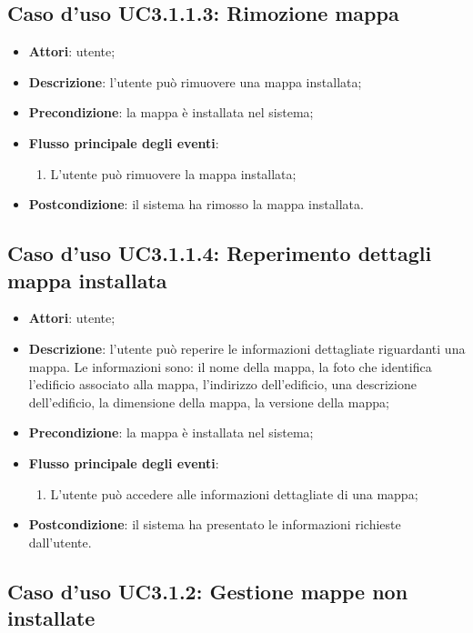 \documentclass[../AnalisiDeiRequisiti.tex]{subfiles}
\begin{document}
\subsection{Caso d'uso UC3.1.1.3: Rimozione mappa}
\begin{itemize}
	\item \textbf{Attori}: utente;
	\item \textbf{Descrizione}: l'utente può rimuovere una mappa installata; 
	\item \textbf{Precondizione}: la mappa è installata nel sistema;
	
	\item \textbf{Flusso principale degli eventi}:
	\begin{enumerate}
		\item L'utente può rimuovere la mappa installata;
		
	\end{enumerate}
	\item \textbf{Postcondizione}: il sistema ha rimosso la mappa installata.
\end{itemize}
\hypertarget{UC3.1.1.4}{}
\subsection{Caso d'uso UC3.1.1.4: Reperimento dettagli mappa installata}
\begin{itemize}
	\item \textbf{Attori}: utente;
	\item \textbf{Descrizione}: l'utente può reperire le informazioni dettagliate riguardanti una mappa. Le informazioni sono: il nome della mappa, la foto che identifica l'edificio associato alla mappa, l'indirizzo dell'edificio, una descrizione dell'edificio, la dimensione della mappa, la versione della mappa; 
	\item \textbf{Precondizione}: la mappa è installata nel sistema;
	
	\item \textbf{Flusso principale degli eventi}:
	\begin{enumerate}
		\item L'utente può accedere alle informazioni dettagliate di una mappa;
		
	\end{enumerate}
	\item \textbf{Postcondizione}: il sistema ha presentato le informazioni richieste dall'utente.
\end{itemize}
\hypertarget{UC3.1.2}{}
\subsection{Caso d'uso UC3.1.2: Gestione mappe non installate}
\end{document}
